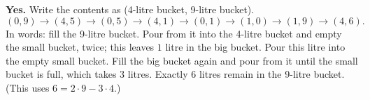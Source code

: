 \textbf{Yes.} Write the contents as (4-litre bucket, 9-litre bucket).
\[
(0,9)\to(4,5)\to(0,5)\to(4,1)\to(0,1)\to(1,0)\to(1,9)\to(4,6).
\]
In words: fill the 9-litre bucket. Pour from it into the 4-litre bucket and empty the small bucket, twice; this leaves $1$ litre in the big bucket. Pour this litre into the empty small bucket. Fill the big bucket again and pour from it until the small bucket is full, which takes $3$ litres. Exactly $\boxed{6}$ litres remain in the 9-litre bucket. (This uses $6=2\cdot9-3\cdot4$.)
